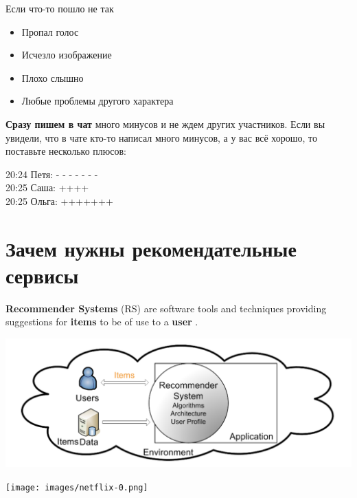 \documentclass[11pt,aspectratio=169,handout=true]{beamer}
\begin{document}
\begin{frame}{Если что-то пошло не так}

\begin{itemize}
\item Пропал голос
\item Исчезло изображение
\item Плохо слышно
\item Любые проблемы другого характера
\end{itemize}
\vfill
{\bf Сразу пишем в чат} много минусов и не ждем других участников. Если вы увидели, что в чате кто-то написал много минусов, а у вас всё хорошо, то поставьте несколько плюсов:
\vfill
\begin{tcolorbox}[colback=gray!5,colframe=gray!80,title=]
20:24 Петя: - - - - - - -  \\
20:25 Саша: ++++ \\
20:25 Ольга: +++++++
\end{tcolorbox}

\end{frame}

\section{Зачем нужны рекомендательные сервисы}

\begin{frame}{}

\vfill
\begin{tcolorbox}[colback=info!5,colframe=info!80,title=]
{\bf Recommender Systems} (RS) are software tools and techniques providing suggestions for {\bf items} to be of use to a {\bf user} \cite{RSHB}.
\end{tcolorbox}
\vfill
\begin{center}
\includegraphics[scale=0.3]{images/overall.png}
\end{center}

\end{frame}

\begin{frame}{}

\begin{center}
\texttt{[image: images/netflix-0.png]}
\end{center}

\end{frame}
\end{document}
